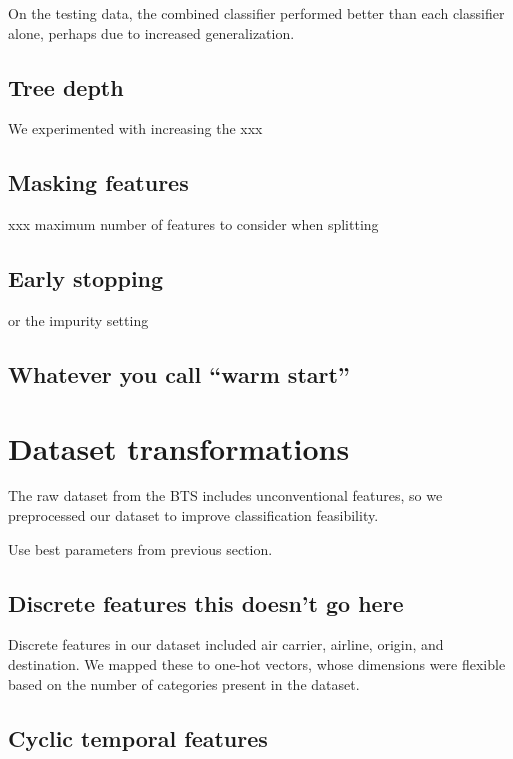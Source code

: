\documentclass{article}
\begin{document}
\begin{multicols}{2}

On the testing data,
the combined classifier performed better
than each classifier alone,
perhaps due to increased generalization.

\subsection{Tree depth}

We experimented with increasing the xxx

\subsection{Masking features}

xxx maximum number of features to consider when splitting

\subsection{Early stopping}

or the impurity setting

\subsection{Whatever you call ``warm start''}

\section{Dataset transformations}
\label{sec:dataset}

The raw dataset from the BTS
includes unconventional features,
so we preprocessed our dataset
to improve classification feasibility.

Use best parameters from previous section.

\subsection{Discrete features this doesn't go here}

Discrete features in our dataset included
air carrier, airline, origin, and destination.
We mapped these to one-hot vectors,
whose dimensions were flexible based on
the number of categories present in the dataset.

\subsection{Cyclic temporal features}


\end{multicols}
\end{document}

